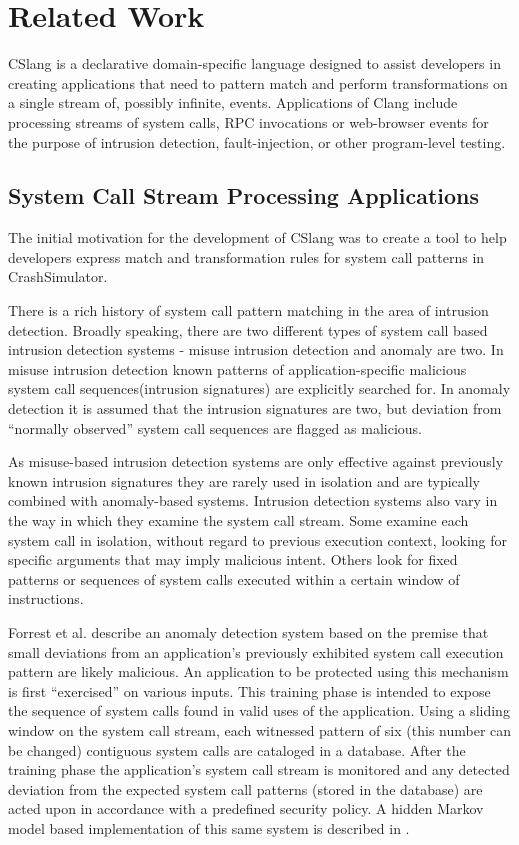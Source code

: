 \section{Related Work}
\label{SEC:related-work}

CSlang is a declarative domain-specific language designed to
assist developers in creating applications that need to pattern match and perform
transformations on a single stream of, possibly infinite, events. Applications
of Clang include processing streams of system calls, RPC invocations or
web-browser events for the purpose of intrusion detection, fault-injection, or
other program-level testing.

\subsection{System Call Stream Processing Applications}
The
initial motivation for the development of CSlang was to create a tool to help
developers express match and transformation rules for system call patterns in
CrashSimulator\cite{DBLP:conf/issre/MooreCFW19}.

There is a rich history of system call pattern
matching in the area of intrusion detection.  Broadly speaking, there are two
different types of system call based intrusion detection systems - misuse
intrusion detection and anomaly are two. In misuse intrusion
detection known patterns of application-specific malicious system call
sequences(intrusion signatures) are explicitly searched for. In anomaly
detection it is assumed that the intrusion signatures are two, but deviation
from “normally observed” system call sequences are flagged as
malicious\cite{DBLP:conf/sp/ForrestHSL96}.

As misuse-based intrusion detection systems are only
effective against previously known intrusion signatures they are rarely used in
isolation and are typically combined with anomaly-based systems. Intrusion
detection systems also vary in the way in which they examine the system call
stream. Some examine each system call in isolation, without regard to previous
execution context, looking for specific arguments that may imply malicious
intent.  Others look for fixed patterns or sequences of system calls executed
within a certain window of instructions.

Forrest et al.\cite{DBLP:conf/sp/ForrestHSL96} describe
an anomaly detection system based on the premise that small deviations from
an application's previously exhibited system call execution pattern are likely
malicious. An application to be protected using this mechanism is first
“exercised” on various inputs. This training phase is intended to expose the
sequence of system calls found in valid uses of the application. Using a sliding
window on the system call stream, each witnessed pattern of six (this number can
be changed) contiguous system calls are cataloged in a database. After the
training phase the application's system call stream is monitored and any detected
deviation from the expected system call patterns (stored in the database) are
acted upon in accordance with a predefined security policy. A hidden Markov model
based implementation of this same system is described in \cite{DBLP:conf/sp/WarrenderFP99}.

